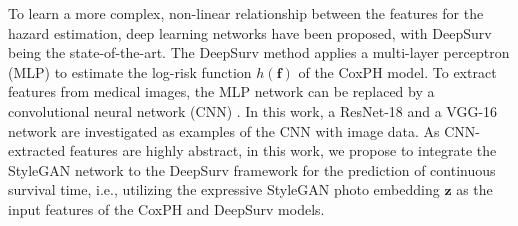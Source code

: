 \documentclass[runningheads]{llncs}
\newcommand{\vz}{\boldsymbol{z}}
\newcommand{\vf}{\boldsymbol{f}}
\newcommand{\vtheta}{\boldsymbol{\theta}}
\newcommand{\TODO}[1]{\textcolor{red}{#1}}
\begin{document}
To learn a more complex, non-linear relationship between the features for the hazard estimation, deep learning networks have been proposed, with DeepSurv \cite{zhu2016deep,katzman2018deepsurv} being the state-of-the-art. The DeepSurv method applies a multi-layer perceptron (MLP) to estimate the log-risk function $h(\vf)$ of the CoxPH model. To extract features from medical images, the MLP network can be replaced by a convolutional neural network (CNN) \cite{zhu2016deep,gurovich2019identifying}. 
In this work, a ResNet-18 and a VGG-16 network are investigated as examples of the CNN with image data. 
As CNN-extracted features are highly abstract, in this work, we propose to integrate the StyleGAN network to the DeepSurv framework for the prediction of continuous survival time, i.e., utilizing the expressive StyleGAN photo embedding $\vz$ as the input features of the CoxPH and DeepSurv models.


\end{document}
